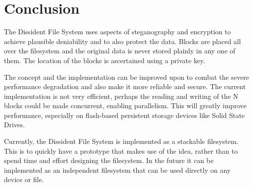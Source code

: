 \documentclass[10pt,twocolumn]{article}
\begin{document}
\section{Conclusion}

The Dissident File System uses aspects of steganography and encryption to achieve plausible deniability and to also protect the data. Blocks are placed all over the filesystem and the original data is never stored plainly in any one of them. The location of the blocks is ascertained using a private key. 

The concept and the implementation can be improved upon to combat the severe performance degradation and also make it more reliable and secure. The current implementation is not very efficient, perhaps the reading and writing of the N blocks could be made concurrent, enabling parallelism. This will greatly improve performance, especially on flash-based persistent storage devices like Solid State Drives. 

Currently, the Dissident File System is implemented as a stackable filesystem. This is to quickly have a prototype that makes use of the idea, rather than to spend time and effort designing the filesystem. In the future it can be implemented as an independent filesystem that can be used directly on any device or file. 



\end{document}

